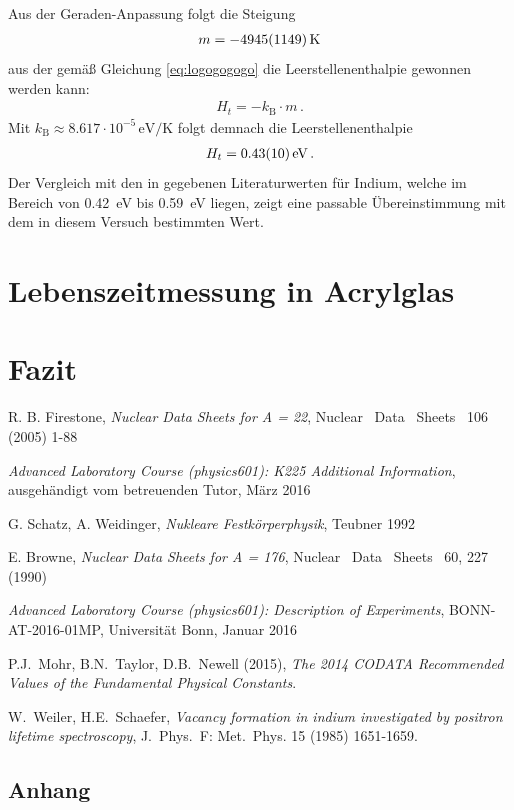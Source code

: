 \documentclass[11pt, a4paper]{article}
\numberwithin{equation}{section}
\begin{document}
Aus der Geraden-Anpassung folgt die Steigung
\begin{align*}
	m = \SI{-4945 +- 1149}{\kelvin}
\end{align*}
aus der gemäß Gleichung \eqref{eq:logogogogo} die Leerstellenenthalpie gewonnen werden kann:
\begin{align*}
	H_t = -k_\mathrm{B} \cdot m \, \text{.}
\end{align*}
Mit $k_\mathrm{B} \approx \num{8.617} \cdot 10^{-5} \, \si{\eV\per\kelvin}$ \cite{codata} folgt demnach die Leerstellenenthalpie
\begin{align*}
	H_t = \SI{0.43 +- 0.10}{\electronvolt} \, \text{.}
\end{align*}
Der Vergleich mit den in \cite{indium} gegebenen Literaturwerten für Indium, welche im Bereich von \SI{0.42}{\eV} bis \SI{0.59}{\eV} liegen, zeigt eine passable Übereinstimmung mit dem in diesem Versuch bestimmten Wert.








\section{Lebenszeitmessung in Acrylglas}

\section{Fazit}

\FloatBarrier
\vspace{\fill}
\begin{thebibliography}{19}
	R. B. Firestone, \emph{Nuclear Data Sheets for A = 22}, Nuclear \ Data \ Sheets \ 106 (2005) 1-88
	
	\emph{Advanced Laboratory Course (physics601): K225 Additional Information}, ausgehändigt vom betreuenden Tutor, März 2016
	
	G. Schatz, A. Weidinger, \emph{Nukleare Festkörperphysik}, Teubner 1992
	
	E. Browne, \emph{Nuclear Data Sheets for A = 176}, Nuclear \ Data \ Sheets \ 60, 227 (1990)
	
	\emph{Advanced Laboratory Course (physics601): Description of Experiments}, BONN-AT-2016-01MP, Universität Bonn, Januar 2016

	P.J.\ Mohr, B.N.\ Taylor, D.B.\ Newell (2015),
	\emph{The 2014 CODATA Recommended Values of the Fundamental Physical Constants}.

	W.\ Weiler, H.E.\ Schaefer,
	\emph{Vacancy formation in indium investigated by positron lifetime spectroscopy},
	J.\ Phys.\ F: Met.\ Phys. 15 (1985) 1651-1659.
\end{thebibliography}

\begin{appendix}
\newpage
\section{Anhang}


\end{appendix}
\end{document}
